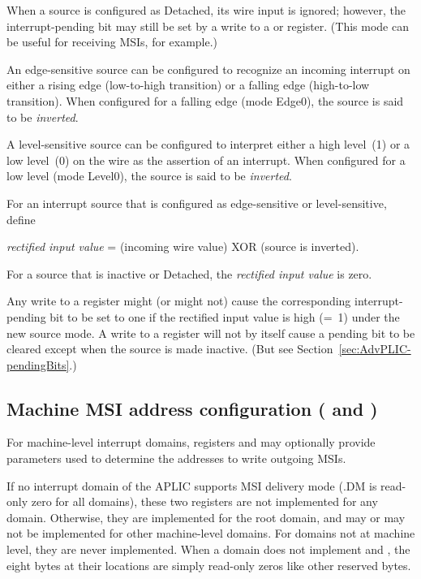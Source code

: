 When a source is configured as Detached, its wire input is ignored;
however, the interrupt-pending bit may still be set by a write to a
 or  register.
(This mode can be useful for receiving MSIs, for example.)

An edge-sensitive source can be configured to recognize an incoming
interrupt on either a rising edge (low-to-high transition) or a falling
edge (high-to-low transition).
When configured for a falling edge (mode Edge0), the source is said to
be \emph{inverted}.

A level-sensitive source can be configured to interpret either a
high level~(1) or a low level~(0) on the wire as the assertion of an
interrupt.
When configured for a low level (mode Level0), the source is said to be
\emph{inverted}.

For an interrupt source that is configured as edge-sensitive or
level-sensitive, define\nopagebreak
\begin{displayLinesTable}
\emph{rectified input value} = (incoming wire value) XOR (source is inverted).
\end{displayLinesTable}
For a source that is inactive or Detached, the
\emph{rectified input value} is zero.

Any write to a  register might (or might not) cause the
corresponding interrupt-pending bit to be set to one if the rectified
input value is high (=~1) under the new source mode.
A write to a  register will not by itself cause a pending
bit to be cleared except when the source is made inactive.
(But see Section~\ref{sec:AdvPLIC-pendingBits}.)

\subsection{%
Machine MSI address configuration
 ( and )%
}
\label{sec:AdvPLIC-reg-mmsiaddrcfg}

For machine-level interrupt domains, registers 
and  may optionally provide parameters used to
determine the addresses to write outgoing MSIs.

If no interrupt domain of the APLIC supports MSI delivery
mode (.DM is read-only zero for all domains),
these two registers are not implemented for any domain.
Otherwise, they are implemented for the root domain, and may
or may not be implemented for other machine-level domains.
For domains not at machine level, they are never implemented.
When a domain does not implement  and
, the eight bytes at their locations
are simply read-only zeros like other reserved bytes.

